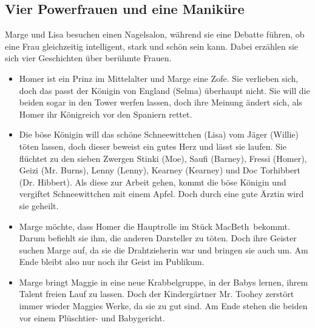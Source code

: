 \subsection{Vier Powerfrauen und eine Maniküre}
Marge und Lisa besuchen einen Nagelsalon, während sie eine Debatte führen, ob eine Frau gleichzeitig intelligent, stark und schön sein kann. Dabei erzählen sie sich vier Geschichten über berühmte Frauen. 
\begin{itemize}
	\item Homer ist ein Prinz im Mittelalter und Marge eine Zofe. Sie verlieben sich, doch das passt der Königin von England (Selma) überhaupt nicht. Sie will die beiden sogar in den Tower werfen lassen, doch ihre Meinung ändert sich, als Homer ihr Königreich vor den Spaniern rettet. 
	\item Die böse Königin will das schöne Schneewittchen (Lisa) vom Jäger (Willie) töten lassen, doch dieser beweist ein gutes Herz und lässt sie laufen. Sie flüchtet zu den sieben Zwergen Stinki (Moe), Saufi (Barney), Fressi (Homer), Geizi (Mr. Burns), Lenny (Lenny), Kearney (Kearney) und Doc Torhibbert (Dr. Hibbert). Als diese zur Arbeit gehen, kommt die böse Königin und vergiftet Schneewittchen mit einem Apfel. Doch durch eine gute Ärztin wird sie geheilt. 
	\item Marge möchte, dass Homer die Hauptrolle im Stück \glqq MacBeth\grqq\ bekommt. Darum befiehlt sie ihm, die anderen Darsteller zu töten. Doch ihre Geister suchen Marge auf, da sie die Drahtzieherin war und bringen sie auch um. Am Ende bleibt also nur noch ihr Geist im Publikum. 
	\item Marge bringt Maggie in eine neue Krabbelgruppe, in der Babys lernen, ihrem Talent freien Lauf zu lassen. Doch der Kindergärtner Mr. Toohey zerstört immer wieder Maggies Werke, da sie zu gut sind. Am Ende stehen die beiden vor einem Plüschtier- und Babygericht. 
\end{itemize}




